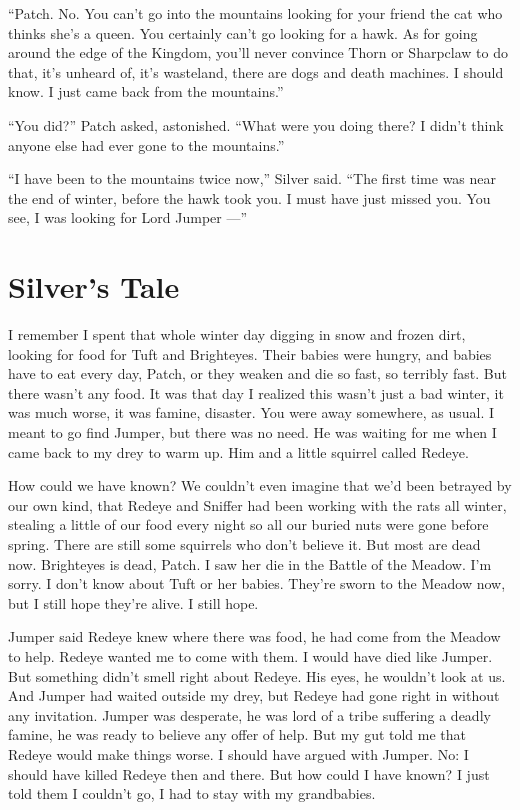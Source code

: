 \documentclass[12pt]{memoir}
\begin{document}
“Patch. No. You can’t go into the mountains looking for your friend
the cat who thinks she’s a queen. You certainly can’t go looking for a
hawk. As for going around the edge of the Kingdom, you’ll never
convince Thorn or Sharpclaw to do that, it’s unheard of, it’s
wasteland, there are dogs and death machines. I should know. I just
came back from the mountains.”

“You did?” Patch asked, astonished. “What were you doing there? I
didn’t think anyone else had ever gone to the mountains.”

“I have been to the mountains twice now,” Silver said. “The first time
was near the end of winter, before the hawk took you. I must have just
missed you. You see, I was looking for Lord Jumper —”


\section{Silver’s Tale}

I remember I spent that whole winter day digging in snow and frozen
dirt, looking for food for Tuft and Brighteyes. Their babies were
hungry, and babies have to eat every day, Patch, or they weaken and
die so fast, so terribly fast. But there wasn’t any food. It was that
day I realized this wasn’t just a bad winter, it was much worse, it
was famine, disaster. You were away somewhere, as usual. I meant to go
find Jumper, but there was no need. He was waiting for me when I came
back to my drey to warm up. Him and a little squirrel called Redeye.

How could we have known? We couldn’t even imagine that we’d been
betrayed by our own kind, that Redeye and Sniffer had been working
with the rats all winter, stealing a little of our food every night so
all our buried nuts were gone before spring. There are still some
squirrels who don’t believe it. But most are dead now. Brighteyes is
dead, Patch. I saw her die in the Battle of the Meadow. I’m sorry. I
don’t know about Tuft or her babies. They’re sworn to the Meadow now,
but I still hope they’re alive. I still hope.

Jumper said Redeye knew where there was food, he had come from the
Meadow to help. Redeye wanted me to come with them. I would have died
like Jumper. But something didn’t smell right about Redeye. His eyes,
he wouldn’t look at us. And Jumper had waited outside my drey, but
Redeye had gone right in without any invitation. Jumper was desperate,
he was lord of a tribe suffering a deadly famine, he was ready to
believe any offer of help. But my gut told me that Redeye would make
things worse. I should have argued with Jumper. No: I should have
killed Redeye then and there. But how could I have known? I just told
them I couldn’t go, I had to stay with my grandbabies.
\end{document}

